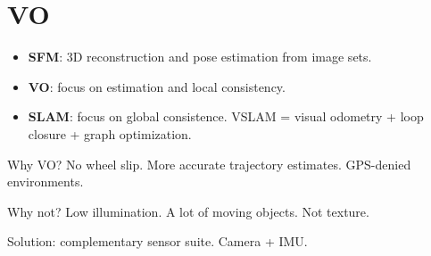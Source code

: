 \section{VO}
\begin{itemize}
  \item \textbf{SFM}: 3D reconstruction and pose estimation from image sets.
  \item \textbf{VO}: focus on estimation and local consistency.
  \item \textbf{SLAM}: focus on global consistence. VSLAM = visual odometry +
    loop closure + graph optimization.
\end{itemize}

\alert{Why VO?}
No wheel slip.
More accurate trajectory estimates.
GPS-denied environments.

\alert{Why not?}
Low illumination.
A lot of moving objects.
Not texture.

\alert{Solution:} complementary sensor suite. Camera + IMU.
